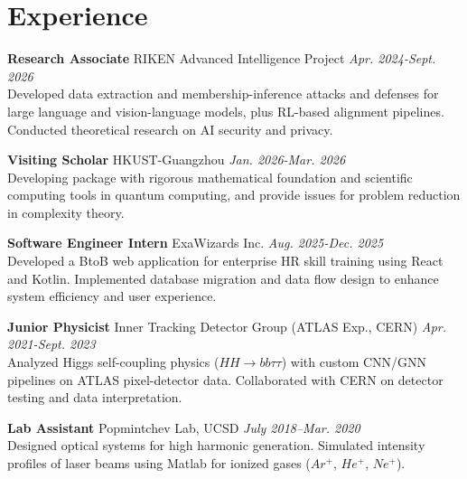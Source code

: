 \documentclass[a4paper,10pt]{article}
\begin{document}
\section*{Experience}
\textbf{Research Associate} \textbar{} \color{sectionblue}RIKEN Advanced Intelligence Project \color{black}\hfill {\em Apr. 2024-Sept. 2026} \\
\textcolor{textgray}{Developed data extraction and membership-inference attacks and defenses for large language and vision-language models, plus RL-based alignment pipelines. Conducted theoretical research on AI security and privacy.}

\textbf{Visiting Scholar} \textbar{} \color{sectionblue}HKUST-Guangzhou \color{black}\hfill {\em Jan. 2026-Mar. 2026} \\
\textcolor{textgray}{Developing package with rigorous mathematical foundation and scientific computing tools in quantum computing, and provide issues for problem reduction in complexity theory.}

\textbf{Software Engineer Intern} \textbar{} \color{sectionblue} ExaWizards Inc.\color{black} \hfill {\em Aug. 2025-Dec. 2025} \\
\textcolor{textgray}{Developed a BtoB web application for enterprise HR skill training using React and Kotlin.
Implemented database migration and data flow design to enhance system efficiency and user experience. }

\textbf{Junior Physicist} \textbar{} \color{sectionblue}Inner Tracking Detector Group (ATLAS Exp., CERN)\color{black} \hfill {\em Apr. 2021-Sept. 2023} \\
\textcolor{textgray}{Analyzed Higgs self-coupling physics ($HH \rightarrow bb\tau\tau$) with custom CNN/GNN pipelines on ATLAS pixel-detector data. Collaborated with CERN on detector testing and data interpretation.}

\textbf{Lab Assistant} \textbar{} \color{sectionblue}Popmintchev Lab, UCSD\color{black} \hfill {\em July 2018–Mar. 2020} \\
\textcolor{textgray}{Designed optical systems for high harmonic generation. Simulated intensity profiles of laser beams using Matlab for ionized gases ($Ar^+$, $He^+$, $Ne^+$).}


\end{document}
